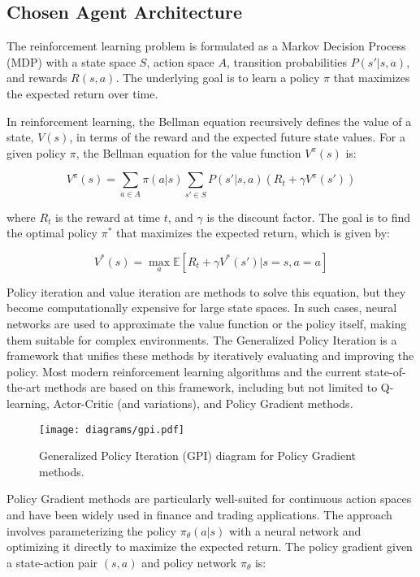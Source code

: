 \documentclass[11pt]{article}
\begin{document}
    \subsection{Chosen Agent Architecture}
    \label{sec:agent}

    The reinforcement learning problem is formulated as a Markov Decision Process (MDP) with a state space \( S \),
    action space \( A \), transition probabilities \( P(s'|s, a) \), and rewards \( R(s, a) \).
    The underlying goal is to learn a policy \( \pi \) that maximizes the expected return over time.

    In reinforcement learning, the Bellman equation recursively defines the value of a state, \( V(s) \),
    in terms of the reward and the expected future state values.
    For a given policy \( \pi \), the Bellman equation for the value function \( V^{\pi}(s) \) is:

    \[
        V^{\pi}(s) = \sum_{a \in A} \pi(a|s) \sum_{s' \in S} P(s'|s, a) \left( R_t + \gamma V^{\pi}(s') \right)
    \]

    where \( R_t \) is the reward at time \( t \), and \( \gamma \) is the discount factor.
    The goal is to find the optimal policy \( \pi^* \) that maximizes the expected return, which is given by:

    \[
        V^*(s) = \max_a \mathbb{E}[R_t + \gamma V^*(s') | s = s, a = a]
    \]

    Policy iteration and value iteration are methods to solve this equation, but they become computationally expensive for large state spaces.
    In such cases, neural networks are used to approximate the value function or the policy itself, making them suitable for complex environments.
    The Generalized Policy Iteration is a framework that unifies these methods by iteratively evaluating and improving the policy.
    Most modern reinforcement learning algorithms and the current state-of-the-art methods are based on this framework,
    including but not limited to Q-learning, Actor-Critic (and variations), and Policy Gradient methods.

    \begin{figure}[htb]
        \centering
        \texttt{[image: diagrams/gpi.pdf]}
        \caption{Generalized Policy Iteration (GPI) diagram for Policy Gradient methods.}
        \label{fig:gpi}
    \end{figure}

    Policy Gradient methods are particularly well-suited for continuous action spaces and have been widely used in finance and trading applications.
    The approach involves parameterizing the policy \( \pi_\theta(a|s) \) with a neural network and optimizing it directly to maximize the expected return.
    The policy gradient given a state-action pair \( (s, a) \) and policy network \( \pi_\theta \) is:
\end{document}
